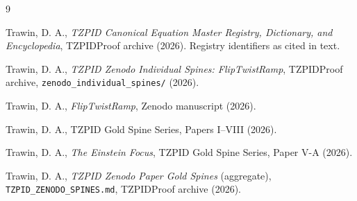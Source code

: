 \documentclass[11pt]{article}
\theoremstyle{remark}
\begin{document}
\begin{thebibliography}{9}

 Trawin, D. A., \emph{TZPID Canonical Equation Master Registry, Dictionary, and Encyclopedia}, TZPIDProof archive (2026). Registry identifiers as cited in text.

 Trawin, D. A., \emph{TZPID Zenodo Individual Spines: FlipTwistRamp}, TZPIDProof archive, \texttt{zenodo\_individual\_spines/} (2026).

 Trawin, D. A., \emph{FlipTwistRamp}, Zenodo manuscript (2026).

 Trawin, D. A., TZPID Gold Spine Series, Papers I--VIII (2026).

 Trawin, D. A., \emph{The Einstein Focus}, TZPID Gold Spine Series, Paper V-A (2026).

 Trawin, D. A., \emph{TZPID Zenodo Paper Gold Spines} (aggregate), \texttt{TZPID\_ZENODO\_SPINES.md}, TZPIDProof archive (2026).

\end{thebibliography}
\end{document}
